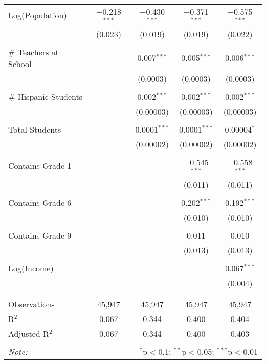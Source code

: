 \begin{table}[!htbp]
\begin{tabular}{@{\extracolsep{-2pt}}lcccc}
 Log(Population) & $-$0.218$^{***}$ & $-$0.430$^{***}$ & $-$0.371$^{***}$ & $-$0.575$^{***}$ \\ 
  & (0.023) & (0.019) & (0.019) & (0.022) \\ 
  & & & & \\ 
 \# Teachers at School &  & 0.007$^{***}$ & 0.005$^{***}$ & 0.006$^{***}$ \\ 
  &  & (0.0003) & (0.0003) & (0.0003) \\ 
  & & & & \\ 
 \# Hispanic Students &  & 0.002$^{***}$ & 0.002$^{***}$ & 0.002$^{***}$ \\ 
  &  & (0.00003) & (0.00003) & (0.00003) \\ 
  & & & & \\ 
 Total Students &  & 0.0001$^{***}$ & 0.0001$^{***}$ & 0.00004$^{*}$ \\ 
  &  & (0.00002) & (0.00002) & (0.00002) \\ 
  & & & & \\ 
 Contains Grade 1 &  &  & $-$0.545$^{***}$ & $-$0.558$^{***}$ \\ 
  &  &  & (0.011) & (0.011) \\ 
  & & & & \\ 
 Contains Grade 6 &  &  & 0.202$^{***}$ & 0.192$^{***}$ \\ 
  &  &  & (0.010) & (0.010) \\ 
  & & & & \\ 
 Contains Grade 9 &  &  & 0.011 & 0.010 \\ 
  &  &  & (0.013) & (0.013) \\ 
  & & & & \\ 
 Log(Income) &  &  &  & 0.067$^{***}$ \\ 
  &  &  &  & (0.004) \\ 
  & & & & \\ 
\hline \\[-1.8ex] 
Observations & 45,947 & 45,947 & 45,947 & 45,947 \\ 
R$^{2}$ & 0.067 & 0.344 & 0.400 & 0.404 \\ 
Adjusted R$^{2}$ & 0.067 & 0.344 & 0.400 & 0.403 \\ 
\hline 
\hline \\[-1.8ex] 
\textit{Note:}  & \multicolumn{4}{r}{$^{*}$p$<$0.1; $^{**}$p$<$0.05; $^{***}$p$<$0.01} \\ 
\end{tabular} 
\end{table} 
